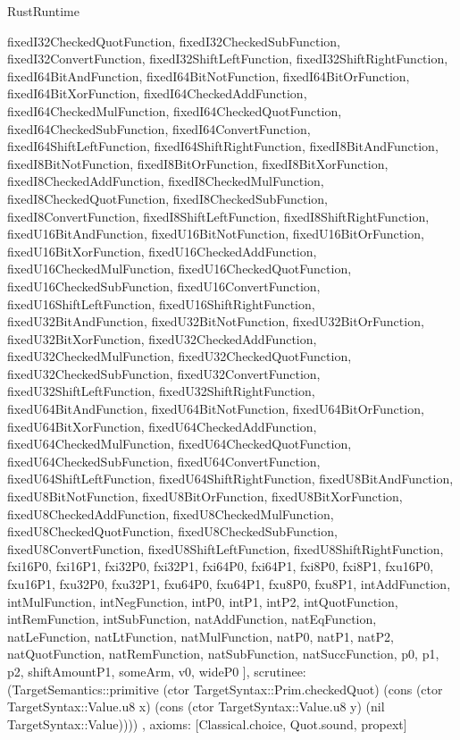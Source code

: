 \begin{lexlean}{RustRuntime}
\begin{semanticmodule}
{{      fixedI32CheckedQuotFunction,
      fixedI32CheckedSubFunction,
      fixedI32ConvertFunction,
      fixedI32ShiftLeftFunction,
      fixedI32ShiftRightFunction,
      fixedI64BitAndFunction,
      fixedI64BitNotFunction,
      fixedI64BitOrFunction,
      fixedI64BitXorFunction,
      fixedI64CheckedAddFunction,
      fixedI64CheckedMulFunction,
      fixedI64CheckedQuotFunction,
      fixedI64CheckedSubFunction,
      fixedI64ConvertFunction,
      fixedI64ShiftLeftFunction,
      fixedI64ShiftRightFunction,
      fixedI8BitAndFunction,
      fixedI8BitNotFunction,
      fixedI8BitOrFunction,
      fixedI8BitXorFunction,
      fixedI8CheckedAddFunction,
      fixedI8CheckedMulFunction,
      fixedI8CheckedQuotFunction,
      fixedI8CheckedSubFunction,
      fixedI8ConvertFunction,
      fixedI8ShiftLeftFunction,
      fixedI8ShiftRightFunction,
      fixedU16BitAndFunction,
      fixedU16BitNotFunction,
      fixedU16BitOrFunction,
      fixedU16BitXorFunction,
      fixedU16CheckedAddFunction,
      fixedU16CheckedMulFunction,
      fixedU16CheckedQuotFunction,
      fixedU16CheckedSubFunction,
      fixedU16ConvertFunction,
      fixedU16ShiftLeftFunction,
      fixedU16ShiftRightFunction,
      fixedU32BitAndFunction,
      fixedU32BitNotFunction,
      fixedU32BitOrFunction,
      fixedU32BitXorFunction,
      fixedU32CheckedAddFunction,
      fixedU32CheckedMulFunction,
      fixedU32CheckedQuotFunction,
      fixedU32CheckedSubFunction,
      fixedU32ConvertFunction,
      fixedU32ShiftLeftFunction,
      fixedU32ShiftRightFunction,
      fixedU64BitAndFunction,
      fixedU64BitNotFunction,
      fixedU64BitOrFunction,
      fixedU64BitXorFunction,
      fixedU64CheckedAddFunction,
      fixedU64CheckedMulFunction,
      fixedU64CheckedQuotFunction,
      fixedU64CheckedSubFunction,
      fixedU64ConvertFunction,
      fixedU64ShiftLeftFunction,
      fixedU64ShiftRightFunction,
      fixedU8BitAndFunction,
      fixedU8BitNotFunction,
      fixedU8BitOrFunction,
      fixedU8BitXorFunction,
      fixedU8CheckedAddFunction,
      fixedU8CheckedMulFunction,
      fixedU8CheckedQuotFunction,
      fixedU8CheckedSubFunction,
      fixedU8ConvertFunction,
      fixedU8ShiftLeftFunction,
      fixedU8ShiftRightFunction,
      fxi16P0,
      fxi16P1,
      fxi32P0,
      fxi32P1,
      fxi64P0,
      fxi64P1,
      fxi8P0,
      fxi8P1,
      fxu16P0,
      fxu16P1,
      fxu32P0,
      fxu32P1,
      fxu64P0,
      fxu64P1,
      fxu8P0,
      fxu8P1,
      intAddFunction,
      intMulFunction,
      intNegFunction,
      intP0,
      intP1,
      intP2,
      intQuotFunction,
      intRemFunction,
      intSubFunction,
      natAddFunction,
      natEqFunction,
      natLeFunction,
      natLtFunction,
      natMulFunction,
      natP0,
      natP1,
      natP2,
      natQuotFunction,
      natRemFunction,
      natSubFunction,
      natSuccFunction,
      p0,
      p1,
      p2,
      shiftAmountP1,
      someArm,
      v0,
      wideP0
    ],
    scrutinee: (TargetSemantics::primitive (ctor TargetSyntax::Prim.checkedQuot) (cons (ctor TargetSyntax::Value.u8 x) (cons (ctor TargetSyntax::Value.u8 y) (nil TargetSyntax::Value))))
  },
  axioms: [Classical.choice, Quot.sound, propext]
}


\end{semanticmodule}
\end{lexlean}
